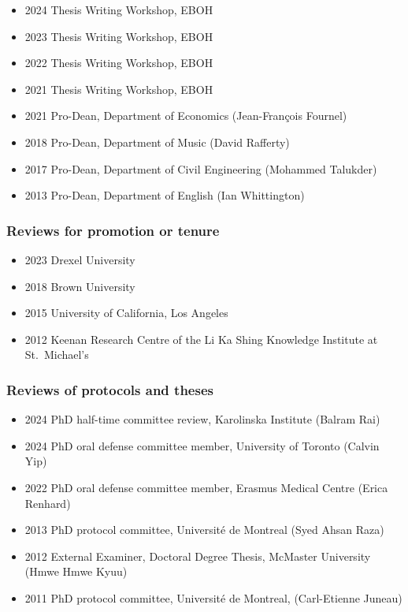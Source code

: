 \documentclass[
  letterpaper,
  DIV=11,
  numbers=noendperiod]{scrartcl}
\providecommand{\tightlist}{%
  \setlength{\itemsep}{0pt}\setlength{\parskip}{0pt}}\usepackage{longtable,booktabs,array}
\begin{document}
\begin{itemize}
\tightlist
\item
  2024 Thesis Writing Workshop, EBOH
\item
  2023 Thesis Writing Workshop, EBOH
\item
  2022 Thesis Writing Workshop, EBOH
\item
  2021 Thesis Writing Workshop, EBOH
\item
  2021 Pro-Dean, Department of Economics (Jean-François Fournel)
\item
  2018 Pro-Dean, Department of Music (David Rafferty)
\item
  2017 Pro-Dean, Department of Civil Engineering (Mohammed Talukder)
\item
  2013 Pro-Dean, Department of English (Ian Whittington)
\end{itemize}

\subsubsection{Reviews for promotion or
tenure}\label{reviews-for-promotion-or-tenure}

\begin{itemize}
\tightlist
\item
  2023 Drexel University
\item
  2018 Brown University
\item
  2015 University of California, Los Angeles
\item
  2012 Keenan Research Centre of the Li Ka Shing Knowledge Institute at
  St.~Michael's
\end{itemize}

\subsubsection{Reviews of protocols and
theses}\label{reviews-of-protocols-and-theses}

\begin{itemize}
\tightlist
\item
  2024 PhD half-time committee review, Karolinska Institute (Balram Rai)
\item
  2024 PhD oral defense committee member, University of Toronto (Calvin
  Yip)
\item
  2022 PhD oral defense committee member, Erasmus Medical Centre (Erica
  Renhard)
\item
  2013 PhD protocol committee, Université de Montreal (Syed Ahsan Raza)
\item
  2012 External Examiner, Doctoral Degree Thesis, McMaster University
  (Hmwe Hmwe Kyuu)
\item
  2011 PhD protocol committee, Université de Montreal, (Carl-Etienne
  Juneau)
\end{itemize}
\end{document}
